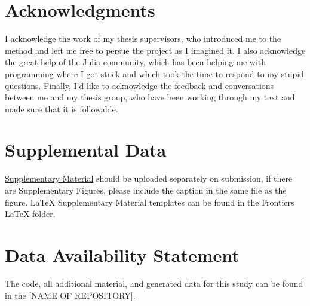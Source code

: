 \documentclass[utf8]{FrontiersinVancouver}
\begin{document}
\section*{Acknowledgments}
I acknowledge the work of my thesis supervisors, who introduced me to the method and left me free to persue the project as I imagined it. I also acknowledge the great help of the Julia community, which has been helping me with programming where I got stuck and which took the time to respond to my stupid questions. Finally, I'd like to acknowledge the feedback and conversations between me and my thesis group, who have been working through my text and made sure that it is followable.

\section*{Supplemental Data}
 \href{http://home.frontiersin.org/about/author-guidelines#SupplementaryMaterial}{Supplementary Material} should be uploaded separately on submission, if there are Supplementary Figures, please include the caption in the same file as the figure. LaTeX Supplementary Material templates can be found in the Frontiers LaTeX folder.

\section*{Data Availability Statement}
The code, all additional material, and generated data for this study can be found in the [NAME OF REPOSITORY]{}.




\end{document}
